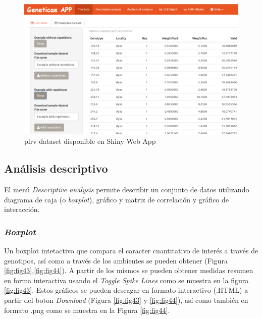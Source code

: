 \begin{figure}[H]
	\begin{center}
		\includegraphics[width=16cm]{./Graficos/Exampledatasets_withrep.png}
	\end{center}
	\caption{plrv dataset disponible en Shiny Web App}
	\label{fig:fig42}
\end{figure}

\subsection{Análisis descriptivo}

El menú \emph{Descriptive analysis} permite describir un conjunto de datos utilizando diagrama de caja (o \emph{boxplot}), gráfico y matriz de correlación y gráfico de interacción.

\subsubsection{\emph{Boxplot}}
Un boxplot intetactivo que compara el caracter cuantitativo de interés a través de genotipos, así como a través de los ambientes se pueden obtener (Figura \ref{fig:fig43},\ref{fig:fig44}). A partir de los mismos se pueden obtener medidas resumen en forma interactiva usando el \emph{Toggle Spike Lines} como se muestra en la figura \ref{fig:fig43}. Estos gráficos se pueden descagar en formato interactivo (.HTML) a partir del boton \emph{Download} (Figura \ref{fig:fig43} y \ref{fig:fig44}), así como también en formato .png como se muestra en la Figura \ref{fig:fig44}.

